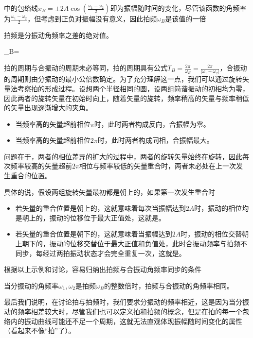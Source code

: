 中的包络线$x_B=\pm 2A\cos(\frac{\omega_1-\omega_2}{2})$即为振幅随时间的变化，尽管该函数的角频率为$\frac{\omega_1-\omega_2}{2}$，但考虑到正负对振幅没有意义，因此拍频$\omega_B$是该值的一倍
\begin{BoxGeneral}[拍频][公式]
    \centering
    拍频是分振动角频率之差的绝对值。
    \begin{BoxEq}
        \omega_B=
    \end{BoxEq}
\end{BoxGeneral}
拍的周期与合振动的周期未必等同，拍的周期具有公式$T_B=\frac{2\pi}{\omega_B}=\frac{2\pi}{|\omega_1-\omega_2|}$，合振动的周期则由分振动的最小公倍数确定。为了充分理解这一点，我们可以通过旋转矢量法考察拍的形成过程。设想两个半径相同的圆，设两组简谐振动的初相均为零，因此两者的旋转矢量在初始时向上，随着矢量的旋转，频率稍高的矢量与频率稍低的矢量出现逐渐增大的夹角。
\begin{itemize}
    \item 当频率高的矢量超前相位$\pi$时，此时两者构成反向，合振幅为零。
    \item 当频率高的矢量超前相位$2\pi$时，此时两者构成同相，合振幅最大。
\end{itemize}
问题在于，两者的相位差异的扩大的过程中，两者的旋转矢量始终在旋转，因此每次频率较高的矢量超前$2\pi$相位与频率较低的矢量重合时，两者未必处在上一次发生重合的位置。

具体的说，假设两组旋转矢量最初都是朝上的，如果第一次发生重合时
\begin{itemize}
    \item 若矢量的重合位置是朝上的，这就意味着每次当振幅达到$2A$时，振动的相位均是朝上的，振动的位移位于最大正值处，这就是。
    \item 若矢量的重合位置是朝下的，这就意味着当振幅达到$2A$时，振动的相位交替朝上朝下的，振动的位移交替位于最大正值和负值处，此时合振动频率与拍频不同步，每经过两拍振动状态才会完全重复一次，这就是。
\end{itemize}
根据以上示例和讨论，容易归纳出拍频与合振动角频率同步的条件
\begin{BoxPrinciple}[拍频与合振动同步的条件]
    当分振动的角频率$\omega_1,\omega_2$是拍频$\omega_B$的整数倍时，拍频与合振动的角频率相同。
\end{BoxPrinciple}
最后我们说明，在讨论拍与拍频时，我们要求分振动的频率相近，这是因为当分振动的频率相差较大时，尽管我们也可以定义拍和拍频的概念，但是在拍的每一个包络内的振动曲线可能还不足一个周期，这就无法直观体现振幅随时间变化的属性（看起来不像“拍”了）。

